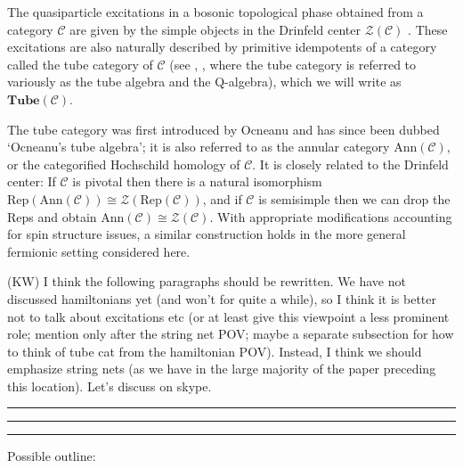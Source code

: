 \documentclass[12pt,a4paper]{article}
\newcommand{\mcz}{\mathcal{Z}}
\newcommand{\mcc}{\mathcal{C}}
\newcommand{\tube}{\textbf{Tube}}
\newcommand{\kw}[1]{{\color{kwcolor}\footnotesize{(KW) #1}}}
\newcommand{\kwsep}{\bigskip\hrule\medskip\hrule\medskip\hrule\bigskip}
\begin{document}
The quasiparticle excitations in a bosonic topological phase obtained from a category $\mcc$ 
are given by the simple objects in the Drinfeld center $\mcz(\mcc)$ \cite{levin2005}.
These excitations are also naturally described by primitive idempotents of a category called the tube category of $\mcc$ (see \cite{ocneanu2001,evans1995,Izumi2000,muger2003b,Bultinck2017}, \cite{Lan2014, Hu2015}, 
where the tube category is referred to variously as the tube algebra and the Q-algebra), 
which we will write as $\tube(\mcc)$.

The tube category was first introduced by Ocneanu \cite{ocneanu1994} and has since 
been dubbed `Ocneanu's tube algebra'; it is also referred to as the annular category $\text{Ann}(\mcc)$, 
or the categorified Hochschild homology of $\mcc$.
It is closely related to the Drinfeld center:
If $\mcc$ is pivotal then there is a natural isomorphism
$\text{Rep}(\text{Ann}(\mcc)) \cong \mcz(\text{Rep}(\mcc))$, and if $\mcc$ is semisimple then we can drop
the $\text{Rep}$s and obtain $\text{Ann}(\mcc) \cong \mcz(\mcc)$.
With appropriate modifications accounting for spin structure issues, a similar construction holds 
in the more general fermionic setting considered here. 


\kw{I think the following paragraphs should be rewritten.
We have not discussed hamiltonians yet (and won't for quite a while), so I think it is better not to talk about
excitations etc (or at least give this viewpoint a less prominent role; mention only after the string net POV;
maybe a separate subsection for how to think of tube cat from the hamiltonian POV).
Instead, I think we should emphasize string nets (as we have in the large majority of the paper
preceding this location).
Let's discuss on skype.}

\kwsep

Possible outline:
\end{document}
